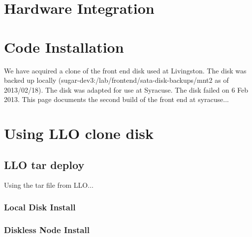 \section{Hardware Integration}

\section{Code Installation}

We have acquired a clone of the front end disk used at Livingston. The disk was backed up locally (sugar-dev3:/lab/frontend/sata-disk-backups/mnt2 as of 2013/02/18). The disk was adapted for use at Syracuse. The disk failed on 6 Feb 2013. This page documents the second build of the front end at syracuse...




\section{Using LLO clone disk}



\subsection{LLO tar deploy}

Using the tar file from LLO...

\subsubsection{Local Disk Install}

\subsubsection{Diskless Node Install}


